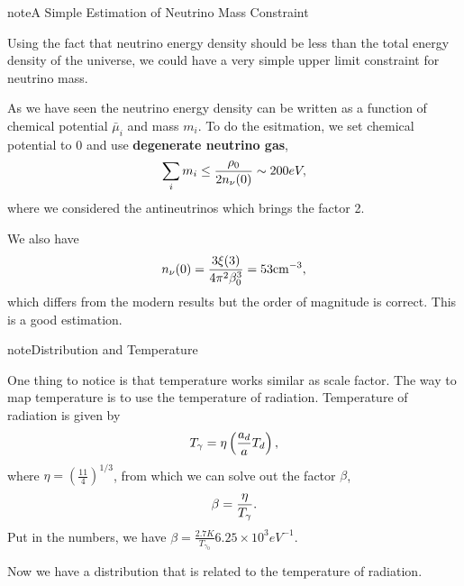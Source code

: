 \documentclass[letterpaper,12pt,english]{sphinxmanual}
\begin{document}
\begin{notice}{note}{A Simple Estimation of Neutrino Mass Constraint}

Using the fact that neutrino energy density should be less than the total energy density of the universe, we could have a very simple upper limit constraint for neutrino mass. \footnotemark[6]

As we have seen the neutrino energy density can be written as a function of chemical potential \(\bar\mu_i\) and mass \(m_i\). To do the esitmation, we set chemical potential to 0 and use \textbf{degenerate neutrino gas},
\begin{gather}
\begin{split}\sum_i m_i \leq \frac{\rho_0}{2 n_\nu(0)} \sim 200 eV,\end{split}\notag
\end{gather}
where we considered the antineutrinos which brings the factor 2.

We also have
\begin{gather}
\begin{split}n_\nu(0) = \frac{3\xi(3) }{4\pi^2 \beta_0^3} = 53 \mathrm{cm}^{-3},\end{split}\notag
\end{gather}
which differs from the modern results but the order of magnitude is correct. This is a good estimation.
\end{notice}

\begin{notice}{note}{Distribution and Temperature}

One thing to notice is that temperature works similar as scale factor. The way to map temperature is to use the temperature of radiation. Temperature of radiation is given by \footnotemark[6]
\begin{gather}
\begin{split}T_\gamma = \eta \left( \frac{a_d}{a} T_d \right),\end{split}\notag
\end{gather}
where \(\eta = \left( \frac{11}{4} \right)^{1/3}\), from which we can solve out the factor \(\beta\),
\begin{gather}
\begin{split}\beta = \frac{\eta}{T_\gamma}.\end{split}\notag
\end{gather}
Put in the numbers, we have \(\beta = \frac{2.7K}{T_{\gamma_0}} 6.25\times 10^{3} eV^{-1}\).

Now we have a distribution that is related to the temperature of radiation.
\end{notice}
\end{document}
